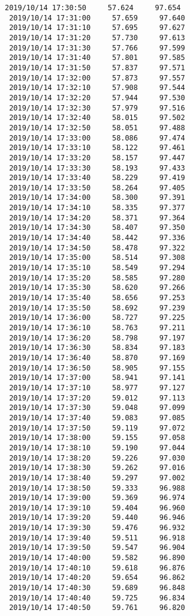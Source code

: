 \documentclass[11pt]{article}
\begin{document}
\begin{Verbatim}[commandchars=\\\{\}]
 2019/10/14 17:30:50     57.624     97.654
 2019/10/14 17:31:00     57.659     97.640
 2019/10/14 17:31:10     57.695     97.627
 2019/10/14 17:31:20     57.730     97.613
 2019/10/14 17:31:30     57.766     97.599
 2019/10/14 17:31:40     57.801     97.585
 2019/10/14 17:31:50     57.837     97.571
 2019/10/14 17:32:00     57.873     97.557
 2019/10/14 17:32:10     57.908     97.544
 2019/10/14 17:32:20     57.944     97.530
 2019/10/14 17:32:30     57.979     97.516
 2019/10/14 17:32:40     58.015     97.502
 2019/10/14 17:32:50     58.051     97.488
 2019/10/14 17:33:00     58.086     97.474
 2019/10/14 17:33:10     58.122     97.461
 2019/10/14 17:33:20     58.157     97.447
 2019/10/14 17:33:30     58.193     97.433
 2019/10/14 17:33:40     58.229     97.419
 2019/10/14 17:33:50     58.264     97.405
 2019/10/14 17:34:00     58.300     97.391
 2019/10/14 17:34:10     58.335     97.377
 2019/10/14 17:34:20     58.371     97.364
 2019/10/14 17:34:30     58.407     97.350
 2019/10/14 17:34:40     58.442     97.336
 2019/10/14 17:34:50     58.478     97.322
 2019/10/14 17:35:00     58.514     97.308
 2019/10/14 17:35:10     58.549     97.294
 2019/10/14 17:35:20     58.585     97.280
 2019/10/14 17:35:30     58.620     97.266
 2019/10/14 17:35:40     58.656     97.253
 2019/10/14 17:35:50     58.692     97.239
 2019/10/14 17:36:00     58.727     97.225
 2019/10/14 17:36:10     58.763     97.211
 2019/10/14 17:36:20     58.798     97.197
 2019/10/14 17:36:30     58.834     97.183
 2019/10/14 17:36:40     58.870     97.169
 2019/10/14 17:36:50     58.905     97.155
 2019/10/14 17:37:00     58.941     97.141
 2019/10/14 17:37:10     58.977     97.127
 2019/10/14 17:37:20     59.012     97.113
 2019/10/14 17:37:30     59.048     97.099
 2019/10/14 17:37:40     59.083     97.085
 2019/10/14 17:37:50     59.119     97.072
 2019/10/14 17:38:00     59.155     97.058
 2019/10/14 17:38:10     59.190     97.044
 2019/10/14 17:38:20     59.226     97.030
 2019/10/14 17:38:30     59.262     97.016
 2019/10/14 17:38:40     59.297     97.002
 2019/10/14 17:38:50     59.333     96.988
 2019/10/14 17:39:00     59.369     96.974
 2019/10/14 17:39:10     59.404     96.960
 2019/10/14 17:39:20     59.440     96.946
 2019/10/14 17:39:30     59.476     96.932
 2019/10/14 17:39:40     59.511     96.918
 2019/10/14 17:39:50     59.547     96.904
 2019/10/14 17:40:00     59.582     96.890
 2019/10/14 17:40:10     59.618     96.876
 2019/10/14 17:40:20     59.654     96.862
 2019/10/14 17:40:30     59.689     96.848
 2019/10/14 17:40:40     59.725     96.834
 2019/10/14 17:40:50     59.761     96.820

\end{Verbatim}
\end{document}
